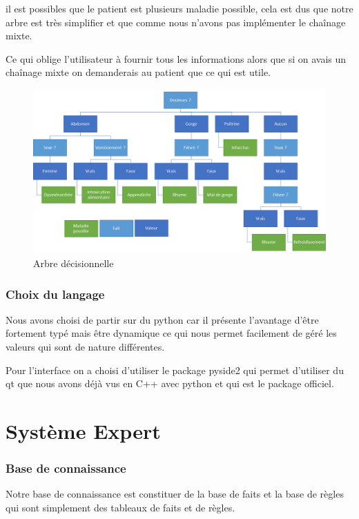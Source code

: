 \documentclass[a4paper, 11pt]{article}
\begin{document}
il est possibles que le patient est plusieurs maladie possible, cela est dus que notre arbre est très simplifier et que comme nous n'avons pas implémenter le chaînage mixte.

Ce qui oblige l'utilisateur à fournir tous les informations alors que si on avais un chaînage mixte on demanderais au patient que ce qui est utile. 

\begin{figure}[H]
    \centering
    \includegraphics[width=15cm]{arbre.png}
    \caption{\label{arbre} Arbre décisionnelle}
\end{figure}

\section{Choix du langage}

Nous avons choisi de partir sur du python car il présente l'avantage d'être fortement typé mais être dynamique ce qui nous permet facilement de géré les valeurs qui sont de nature différentes.

Pour l'interface on a choisi d'utiliser le package pyside2 qui permet d'utiliser du qt que nous avons déjà vus en C++ avec python et qui est le package officiel.

\part{Système Expert}

\section{Base de connaissance}

Notre base de connaissance est constituer de la base de faits et la base de règles qui sont simplement des tableaux de faits et de règles.
\end{document}
